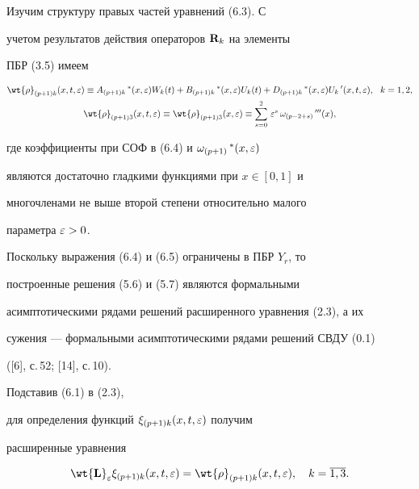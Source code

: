 Изучим структуру правых частей уравнений (6.3). С


учетом результатов действия операторов $ \bold{R}_k$ на элементы


ПБР (3.5) имеем


\begin{gather}


{\wt{\rho}}_{(p+1)k} (x,t, \e) \equiv A_{(p+1)k}\,^* (x, \e) W_k


(t) + B_{(p+1)k}\,^* (x, \e) U_k (t) +D_{(p+1)k}\,^* (x, \e) U_k\, '


(x,t, \e), \ \ k=1,2,\\


%


\wt{\rho}_{(p+1)3} (x,t, \e) \equiv \wt{\rho}_{(p+1)3} (x, \e) \equiv


\sum_{s=0} ^2\, \e^s \, {\omega}_{(p-2+s) }\, ''' (x), 


\end{gather}


где коэффициенты при СОФ в (6.4) и $\omega_{(p+1)}\,^*(x,\varepsilon)$


являются достаточно гладкими функциями при $x \in [0,1]$ и 


многочленами не выше второй степени относительно малого


параметра $\varepsilon > 0$.





Поскольку выражения (6.4) и (6.5) ограничены в ПБР $Y_r$, то


построенные решения (5.6) и (5.7) являются формальными


асимптотическими рядами решений расширенного уравнения (2.3), а их


сужения --- формальными асимптотическими рядами решений СВДУ (0.1)


([6], с.\,52; [14], с.\,10).





Подставив (6.1) в (2.3),


для определения функций $ \xi_{(p+1)k} (x,t, \varepsilon)$ получим


расширенные уравнения


\begin{equation}


\bold{\wt{L}}_{\e} \xi_{(p+1)k} (x,t, \e) =


{\wt{\rho}}_{(p+1)k} (x,t, \e), \quad k=\overline{1,3}. 


\end{equation}





